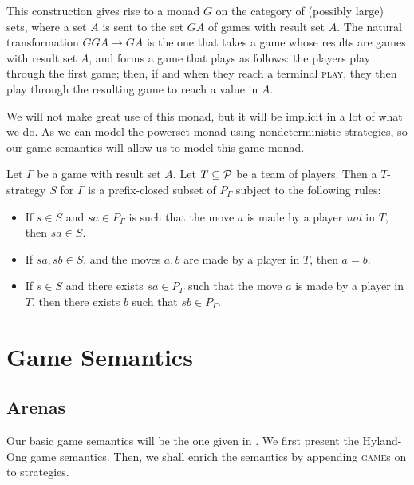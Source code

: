 \documentclass{article}
\newcommand{\game}{\textsc{game}}
\newcommand{\play}{\textsc{play}}
\begin{document}
\begin{remark}
  This construction gives rise to a monad $G$ on the category of (possibly large) sets, where a set $A$ is sent to the set $GA$ of games with result set $A$.  
  The natural transformation $GGA\to GA$ is the one that takes a game whose results are games with result set $A$, and forms a game that plays as follows: the players play through the first game; then, if and when they reach a terminal \play{}, they then play through the resulting game to reach a value in $A$.

  We will not make great use of this monad, but it will be implicit in a lot of what we do.  
  As we can model the powerset monad using nondeterministic strategies, so our game semantics will allow us to model this game monad.
\end{remark}

\begin{definition}
  Let $\Gamma$ be a game with result set $A$.  
  Let $T\subset \P$ be a team of players.  
  Then a $T$-strategy $S$ for $\Gamma$ is a prefix-closed subset of $P_\Gamma$ subject to the following rules:
  \begin{itemize}
    \item If $s\in S$ and $sa\in P_\Gamma$ is such that the move $a$ is made by a player \emph{not} in $T$, then $sa\in S$.
    \item If $sa,sb\in S$, and the moves $a,b$ are made by a player in $T$, then $a=b$.
    \item If $s\in S$ and there exists $sa\in P_\Gamma$ such that the move $a$ is made by a player in $T$, then there exists $b$ such that $sb\in P_\Gamma$.
  \end{itemize}
\end{definition}

\section{Game Semantics}

\subsection{Arenas}

Our basic game semantics will be the one given in \cite{hoPcf}.  
We first present the Hyland-Ong game semantics.  
Then, we shall enrich the semantics by appending \game{}s on to strategies.
\end{document}
